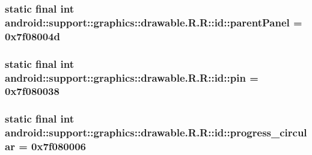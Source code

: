 \hypertarget{classandroid_1_1support_1_1graphics_1_1drawable_1_1_r_1_1id_641f865af46d889eb08e5aa95f848279}{
\subsubsection[{parentPanel}]{\setlength{\rightskip}{0pt plus 5cm}static final int android::support::graphics::drawable.R.R::id::parentPanel = 0x7f08004d}}
\label{classandroid_1_1support_1_1graphics_1_1drawable_1_1_r_1_1id_641f865af46d889eb08e5aa95f848279}


\hypertarget{classandroid_1_1support_1_1graphics_1_1drawable_1_1_r_1_1id_392bb3a7fa3379ce60f0cce20b7202ee}{
\subsubsection[{pin}]{\setlength{\rightskip}{0pt plus 5cm}static final int android::support::graphics::drawable.R.R::id::pin = 0x7f080038}}
\label{classandroid_1_1support_1_1graphics_1_1drawable_1_1_r_1_1id_392bb3a7fa3379ce60f0cce20b7202ee}


\hypertarget{classandroid_1_1support_1_1graphics_1_1drawable_1_1_r_1_1id_57e07a29ab88383537f4d69be9dfca3a}{
\subsubsection[{progress\_\-circular}]{\setlength{\rightskip}{0pt plus 5cm}static final int android::support::graphics::drawable.R.R::id::progress\_\-circular = 0x7f080006}}
\label{classandroid_1_1support_1_1graphics_1_1drawable_1_1_r_1_1id_57e07a29ab88383537f4d69be9dfca3a}


